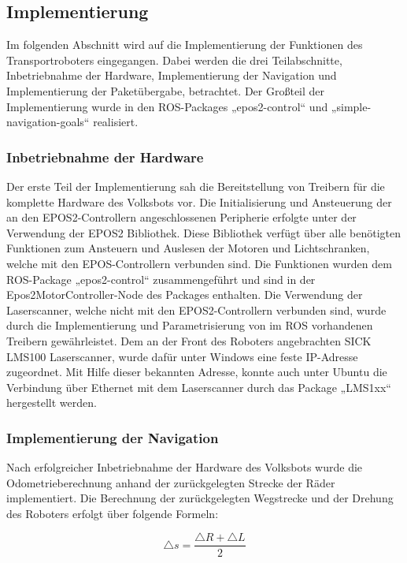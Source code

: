 \subsection{Implementierung}

Im folgenden Abschnitt wird auf die Implementierung der Funktionen des Transportroboters eingegangen. Dabei werden die drei Teilabschnitte, Inbetriebnahme der Hardware, Implementierung der Navigation und Implementierung der Paketübergabe, betrachtet. Der Großteil der Implementierung wurde in den ROS-Packages „epos2-control“ und „simple-navigation-goals“ realisiert.

\subsubsection{Inbetriebnahme der Hardware}
Der erste Teil der Implementierung sah die Bereitstellung von Treibern für die komplette Hardware des Volksbots vor. Die Initialisierung und Ansteuerung der an den EPOS2-Controllern angeschlossenen Peripherie erfolgte unter der Verwendung der EPOS2 Bibliothek. Diese Bibliothek verfügt über alle benötigten Funktionen zum Ansteuern und Auslesen der Motoren und Lichtschranken, welche mit den EPOS-Controllern verbunden sind. Die Funktionen wurden dem ROS-Package „epos2-control“ zusammengeführt und sind in der Epos2MotorController-Node des Packages enthalten. 
Die Verwendung der Laserscanner, welche nicht mit den EPOS2-Controllern verbunden sind, wurde durch die Implementierung und Parametrisierung von im ROS vorhandenen Treibern gewährleistet. Dem an der Front des Roboters angebrachten SICK LMS100 Laserscanner, wurde dafür unter Windows eine feste IP-Adresse zugeordnet. Mit Hilfe dieser bekannten Adresse, konnte auch unter Ubuntu die Verbindung über Ethernet mit dem Laserscanner durch das Package „LMS1xx“  hergestellt werden.

\subsubsection{Implementierung der Navigation}
Nach erfolgreicher Inbetriebnahme der Hardware des Volksbots wurde die Odometrieberechnung anhand der zurückgelegten Strecke der Räder implementiert. Die Berechnung der zurückgelegten Wegstrecke und der Drehung des Roboters erfolgt über folgende Formeln\cite[S. 1]{Der:2000}:

\begin{equation}
\triangle s = \dfrac{\triangle R + \triangle L}{2}
\end{equation}
 
